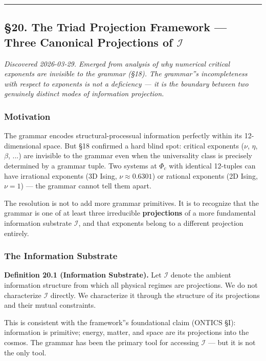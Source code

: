 \documentclass[12pt,a4paper]{article}
\newcommand{\pilcrow}{\S}
\begin{document}
\begin{center}
\rule{0.5\textwidth}{0.4pt}
\end{center}

\subsection{\pilcrow{}20. The Triad Projection Framework --- Three Canonical Projections of $\mathcal{I}$}

\emph{Discovered 2026-03-29. Emerged from analysis of why numerical critical exponents are invisible to the grammar (\pilcrow{}18). The grammar''s incompleteness with respect to exponents is not a deficiency --- it is the boundary between two genuinely distinct modes of information projection.}

\subsubsection{Motivation}

The grammar encodes structural-processual information perfectly within its 12-dimensional space. But \pilcrow{}18 confirmed a hard blind spot: critical exponents ($\nu$, $\eta$, $\beta$, ...) are invisible to the grammar even when the universality class is precisely determined by a grammar tuple. Two systems at $\Phi_c$ with identical 12-tuples can have irrational exponents (3D Ising, $\nu \approx 0.6301$) or rational exponents (2D Ising, $\nu = 1$) --- the grammar cannot tell them apart.

The resolution is not to add more grammar primitives. It is to recognize that the grammar is one of at least three irreducible \textbf{projections} of a more fundamental information substrate $\mathcal{I}$, and that exponents belong to a different projection entirely.

\subsubsection{The Information Substrate}

\textbf{Definition 20.1 (Information Substrate).} Let $\mathcal{I}$ denote the ambient information structure from which all physical regimes are projections. We do not characterize $\mathcal{I}$ directly. We characterize it through the structure of its projections and their mutual constraints.

This is consistent with the framework''s foundational claim (ONTICS \pilcrow{}I): information is primitive; energy, matter, and space are its projections into the cosmos. The grammar has been the primary tool for accessing $\mathcal{I}$ --- but it is not the only tool.
\end{document}

